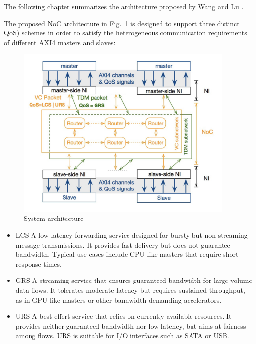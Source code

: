 The following chapter summarizes the architecture proposed by Wang and Lu \cite{wang_flexible_2022}.

The proposed NoC architecture in Fig.~\ref{fig:System_Architecture} is designed to support three distinct \ac{QoS}) schemes in order to satisfy the heterogeneous communication requirements of different AXI4 masters and slaves:

\begin{figure}[htbp]
    \centering
    \includegraphics[width=0.95\textwidth]{img/System Architecture.png}
    \caption{System architecture}
    \label{fig:System_Architecture}
\end{figure}

\begin{itemize}
    \item \ac{LCS} A low-latency forwarding service designed for bursty but non-streaming message transmissions. It provides fast delivery but does not guarantee bandwidth. Typical use cases include CPU-like masters that require short response times.
    \item \ac{GRS} A streaming service that ensures guaranteed bandwidth for large-volume data flows. It tolerates moderate latency but requires sustained throughput, as in GPU-like masters or other bandwidth-demanding accelerators.
    \item \ac{URS} A best-effort service that relies on currently available resources. It provides neither guaranteed bandwidth nor low latency, but aims at fairness among flows. URS is suitable for I/O interfaces such as SATA or USB.
\end{itemize}

